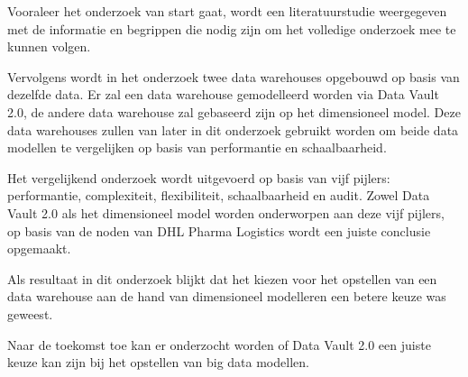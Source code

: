 Vooraleer het onderzoek van start gaat, wordt een literatuurstudie weergegeven met de informatie en begrippen die nodig zijn om het volledige onderzoek mee te kunnen volgen.

Vervolgens wordt in het onderzoek twee data warehouses opgebouwd op basis van dezelfde data. Er zal een data warehouse gemodelleerd worden via Data Vault 2.0, de andere data warehouse zal gebaseerd zijn op het dimensioneel model. Deze data warehouses zullen van later in dit onderzoek gebruikt worden om beide data modellen te vergelijken op basis van performantie en schaalbaarheid.

Het vergelijkend onderzoek wordt uitgevoerd op basis van vijf pijlers: performantie, complexiteit, flexibiliteit, schaalbaarheid en audit. Zowel Data Vault 2.0 als het dimensioneel model worden onderworpen aan deze vijf pijlers, op basis van de noden van DHL Pharma Logistics wordt een juiste conclusie opgemaakt. 

Als resultaat in dit onderzoek blijkt dat het kiezen voor het opstellen van een data warehouse aan de hand van dimensioneel modelleren een betere keuze was geweest.

Naar de toekomst toe kan er onderzocht worden of Data Vault 2.0 een juiste keuze kan zijn bij het opstellen van big data modellen.